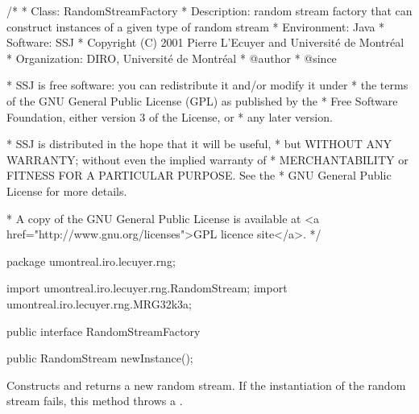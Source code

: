 \begin{code}
\begin{hide}
/*
 * Class:        RandomStreamFactory
 * Description:  random stream factory that can construct instances of
                 a given type of random stream
 * Environment:  Java
 * Software:     SSJ 
 * Copyright (C) 2001  Pierre L'Ecuyer and Université de Montréal
 * Organization: DIRO, Université de Montréal
 * @author       
 * @since

 * SSJ is free software: you can redistribute it and/or modify it under
 * the terms of the GNU General Public License (GPL) as published by the
 * Free Software Foundation, either version 3 of the License, or
 * any later version.

 * SSJ is distributed in the hope that it will be useful,
 * but WITHOUT ANY WARRANTY; without even the implied warranty of
 * MERCHANTABILITY or FITNESS FOR A PARTICULAR PURPOSE.  See the
 * GNU General Public License for more details.

 * A copy of the GNU General Public License is available at
   <a href="http://www.gnu.org/licenses">GPL licence site</a>.
 */
\end{hide}
package umontreal.iro.lecuyer.rng;\begin{hide}

import umontreal.iro.lecuyer.rng.RandomStream;
import umontreal.iro.lecuyer.rng.MRG32k3a;
\end{hide}

public interface RandomStreamFactory\begin{hide} {
\end{hide}

   public RandomStream newInstance();\begin{hide}

}\end{hide}
\end{code}
\begin{tabb}   Constructs and returns a new random stream.
 If the instantiation of the random stream fails,
 this method throws a .
\end{tabb}
\begin{htmlonly}
\end{htmlonly}

